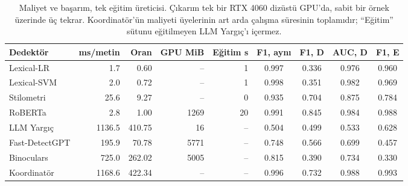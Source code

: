 \begin{table}[t]
\centering
\footnotesize
\caption{Maliyet ve başarım, tek eğitim üreticisi. Çıkarım tek bir RTX 4060 dizüstü GPU'da, sabit bir örnek üzerinde üç tekrar. Koordinatör'ün maliyeti üyelerinin art arda çalışma süresinin toplamıdır; ``Eğitim'' sütunu eğitilmeyen LLM Yargıç'ı içermez.}
\label{tab:cost}
\begin{tabular}{lrrrrcccc}
\toprule
Dedektör & ms/metin & Oran & GPU MiB & Eğitim s & F1, aynı & F1, D & AUC, D & F1, E \\
\midrule
Lexical-LR & 1.7 & 0.60 & -- & 1 & 0.997 & 0.336 & 0.976 & 0.960 \\
Lexical-SVM & 2.0 & 0.72 & -- & 1 & 0.998 & 0.351 & 0.982 & 0.969 \\
Stilometri & 25.6 & 9.27 & -- & 0 & 0.935 & 0.704 & 0.875 & 0.784 \\
RoBERTa & 2.8 & 1.00 & 1269 & 20 & 0.991 & 0.845 & 0.984 & 0.988 \\
LLM Yargıç & 1136.5 & 410.75 & 16 & -- & 0.504 & 0.499 & 0.533 & 0.628 \\
Fast-DetectGPT & 195.9 & 70.78 & 5771 & -- & 0.748 & 0.566 & 0.699 & 0.457 \\
Binoculars & 725.0 & 262.02 & 5005 & -- & 0.815 & 0.390 & 0.734 & 0.330 \\
Koordinatör & 1168.6 & 422.34 & -- & -- & 0.996 & 0.732 & 0.988 & 0.993 \\
\bottomrule
\end{tabular}
\end{table}
